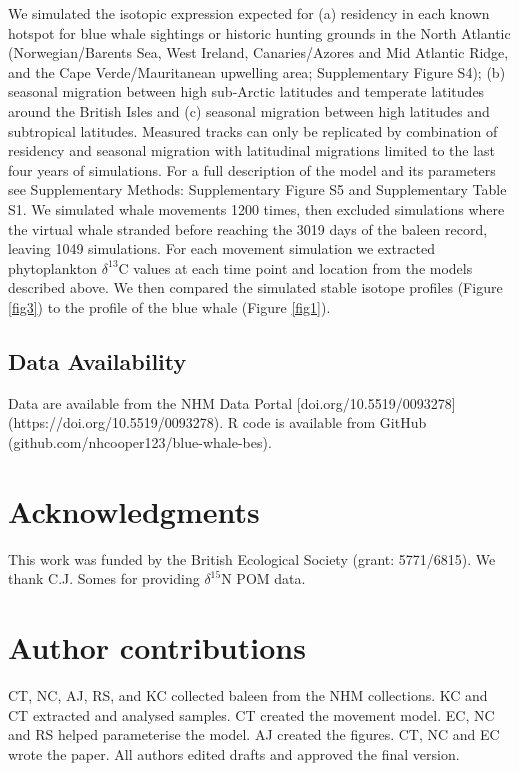 \documentclass[a4paper,12pt]{article}
\begin{document}
We simulated the isotopic expression expected for (a) residency in each known hotspot for blue whale sightings or historic hunting grounds in the North Atlantic (Norwegian/Barents Sea, West Ireland, Canaries/Azores and Mid Atlantic Ridge, and the Cape Verde/Mauritanean upwelling area\cite{mcdonald2006biogeographic,reilly2008balaenoptera,sigurjonsson1995life}; Supplementary Figure S4); (b) seasonal migration between high sub-Arctic latitudes and temperate latitudes around the British Isles and (c) seasonal migration between high latitudes and subtropical latitudes. 
Measured tracks can only be replicated by combination of residency and seasonal migration with latitudinal migrations limited to the last four years of simulations.
For a full description of the model and its parameters see Supplementary Methods: Supplementary Figure S5 and Supplementary Table S1. 
We simulated whale movements 1200 times, then excluded simulations where the virtual whale stranded before reaching the 3019 days of the baleen record, leaving 1049 simulations.
For each movement simulation we extracted phytoplankton $\delta^{13}$C values at each time point and location from the models described above\cite{magozzi2017using}. 
We then compared the simulated stable isotope profiles (Figure \ref{fig3}) to the profile of the blue whale (Figure \ref{fig1}).
 
\subsection{Data Availability}
Data are available from the NHM Data Portal [doi.org/10.5519/0093278](https://doi.org/10.5519/0093278). 
R code is available from GitHub (github.com/nhcooper123/blue-whale-bes).
{}





\section{Acknowledgments}
This work was funded by the British Ecological Society (grant: 5771/6815). 
We thank C.J. Somes for providing  $\delta^{15}$N POM data.

\section{Author contributions}
CT, NC, AJ, RS, and KC collected baleen from the NHM collections. 
KC and CT extracted and analysed samples.
CT created the movement model.
EC, NC and RS helped parameterise the model.
AJ created the figures. 
CT, NC and EC wrote the paper.
All authors edited drafts and approved the final version.
\end{document}
